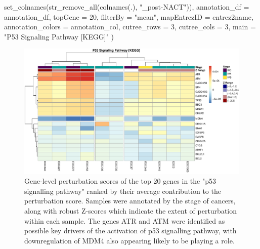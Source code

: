\documentclass[9pt,a4paper,]{extarticle}
\newenvironment{Shaded}{\begin{snugshade}}{\end{snugshade}}
\newcommand{\AttributeTok}[1]{\textcolor[rgb]{0.77,0.63,0.00}{#1}}
\newcommand{\DecValTok}[1]{\textcolor[rgb]{0.00,0.00,0.81}{#1}}
\newcommand{\FunctionTok}[1]{\textcolor[rgb]{0.00,0.00,0.00}{#1}}
\newcommand{\NormalTok}[1]{#1}
\newcommand{\StringTok}[1]{\textcolor[rgb]{0.31,0.60,0.02}{#1}}
\begin{document}
\begin{Shaded}
\begin{Highlighting}[]
        \FunctionTok{set\_colnames}\NormalTok{(}\FunctionTok{str\_remove\_all}\NormalTok{(}\FunctionTok{colnames}\NormalTok{(.), }\StringTok{"\_post{-}NACT"}\NormalTok{)), }
    \AttributeTok{annotation\_df =}\NormalTok{  annotation\_df, }
    \AttributeTok{topGene =} \DecValTok{20}\NormalTok{, }\AttributeTok{filterBy =} \StringTok{"mean"}\NormalTok{, }
    \AttributeTok{mapEntrezID =}\NormalTok{ entrez2name,}
    \AttributeTok{annotation\_colors =}\NormalTok{ annotation\_col,}
    \AttributeTok{cutree\_rows =} \DecValTok{3}\NormalTok{, }\AttributeTok{cutree\_cols =} \DecValTok{3}\NormalTok{,}
    \AttributeTok{main =} \StringTok{"P53 Signaling Pathway [KEGG]"}
\NormalTok{)}
\end{Highlighting}
\end{Shaded}

\begin{figure}

{\centering \includegraphics[width=1\linewidth]{sSNAPPY_paper_files/figure-latex/Figure7-1} 

}

\caption{Gene-level perturbation scores of the top 20 genes in the "p53 signalling pathway" ranked by their average contribution to the perturbation score. Samples were annotated by the stage of cancers, along with robust Z-scores which indicate the extent of perturbation within each sample. The genes ATR and ATM were identified as possible key drivers of the activation of p53 signalling pathway, with downregulation of MDM4 also appearing likely to be playing a role.}\label{fig:Figure7}
\end{figure}
\end{document}
